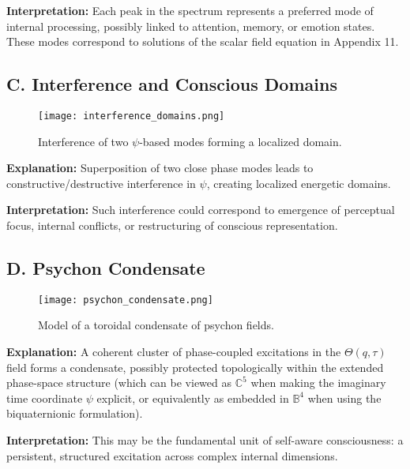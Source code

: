 \textbf{Interpretation:} Each peak in the spectrum represents a preferred mode of internal processing, possibly linked to attention, memory, or emotion states. These modes correspond to solutions of the scalar field equation in Appendix 11.

\subsection*{C. Interference and Conscious Domains}

\begin{figure}[H]
\centering
\texttt{[image: interference\_domains.png]}
\caption{Interference of two \(\psi\)-based modes forming a localized domain.}
\end{figure}

\textbf{Explanation:} Superposition of two close phase modes leads to constructive/destructive interference in \(\psi\), creating localized energetic domains.

\textbf{Interpretation:} Such interference could correspond to emergence of perceptual focus, internal conflicts, or restructuring of conscious representation.

\subsection*{D. Psychon Condensate}

\begin{figure}[H]
\centering
\texttt{[image: psychon\_condensate.png]}
\caption{Model of a toroidal condensate of psychon fields.}
\end{figure}

\textbf{Explanation:} A coherent cluster of phase-coupled excitations in the \(\Theta(q, \tau)\) field forms a condensate, possibly protected topologically within the extended phase-space structure (which can be viewed as \(\mathbb{C}^5\) when making the imaginary time coordinate \(\psi\) explicit, or equivalently as embedded in \(\mathbb{B}^4\) when using the biquaternionic formulation).

\textbf{Interpretation:} This may be the fundamental unit of self-aware consciousness: a persistent, structured excitation across complex internal dimensions.

